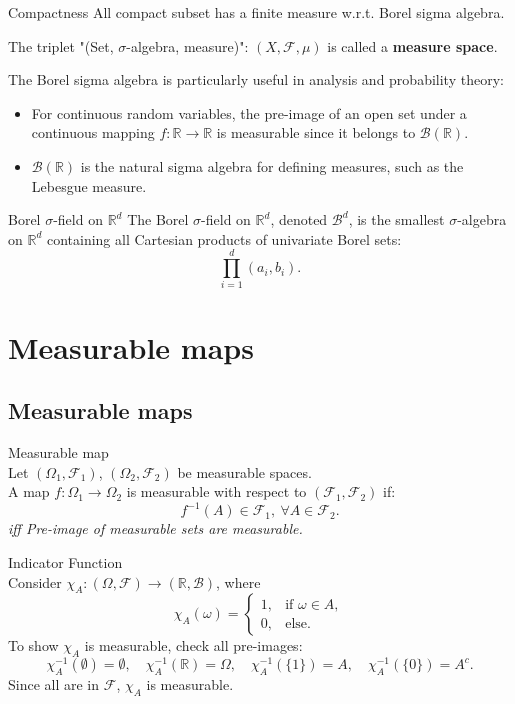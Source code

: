 \begin{lem}{Compactness}
	All compact subset has a finite measure w.r.t. Borel sigma algebra. 
\end{lem}

\begin{rmk}
The triplet "(Set, $\sigma$-algebra, measure)": \((X, \mathscr{F}, \mu)\) is called a \textbf{measure space}.
\end{rmk}

\begin{rmk}
The Borel sigma algebra is particularly useful in analysis and probability theory:
\begin{itemize}
    \item For continuous random variables, the pre-image of an open set under a continuous mapping \( f: \mathbb{R} \to \mathbb{R} \) is measurable since it belongs to \( \mathscr{B}(\mathbb{R}) \).
    \item \( \mathscr{B}(\mathbb{R}) \) is the natural sigma algebra for defining measures, such as the Lebesgue measure.
\end{itemize}
\end{rmk}

\begin{df}{Borel $\sigma$-field on $\mathbb{R}^d$}
The Borel $\sigma$-field on $\mathbb{R}^d$, denoted $\mathscr{B}^d$, is the smallest $\sigma$-algebra on $\mathbb{R}^d$ containing all Cartesian products of univariate Borel sets:
\[
\prod_{i=1}^d (a_i, b_i).
\]
\end{df}


\newpage
\section{Measurable maps}
\subsection{Measurable maps}
\begin{df}{Measurable map}\\
Let \( (\Omega_1, \mathscr{F}_1) \), \( (\Omega_2, \mathscr{F}_2) \) be measurable spaces. \\
A map \( f: \Omega_1 \to \Omega_2 \) is measurable with respect to \( (\mathscr{F}_1, \mathscr{F}_2) \) if:
\[
f^{-1}(A) \in \mathscr{F}_1, \ \forall A \in \mathscr{F}_2.
\]
\noindent \textit{iff Pre-image of measurable sets are measurable.}
\end{df}

\begin{eg}{Indicator Function}\\
\noindent Consider \( \chi_A: (\Omega, \mathscr{F}) \to (\mathbb{R}, \mathscr{B}) \), where
\[
\chi_A(\omega) =
\begin{cases}
1, & \text{if } \omega \in A, \\
0, & \text{else}.
\end{cases}
\]
To show \( \chi_A \) is measurable, check all pre-images:
\[
\chi_A^{-1}(\emptyset) = \emptyset, \quad \chi_A^{-1}(\mathbb{R}) = \Omega, \quad \chi_A^{-1}(\{1\}) = A, \quad \chi_A^{-1}(\{0\}) = A^c.
\]
Since all are in \( \mathscr{F} \), \( \chi_A \) is measurable.

\end{eg}

